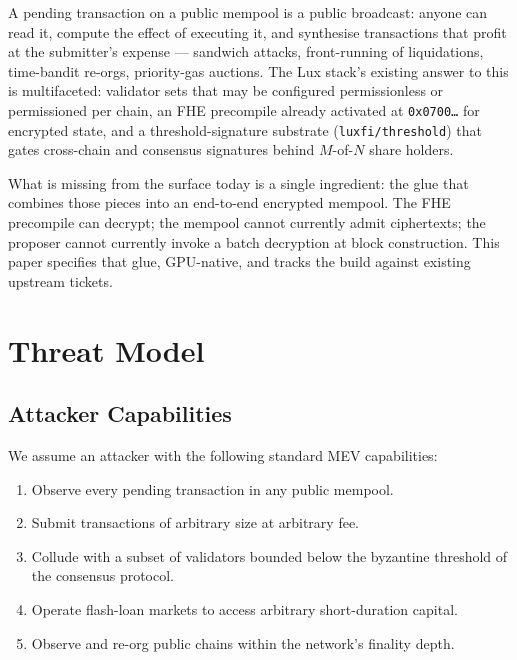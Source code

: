 \documentclass[11pt,a4paper]{article}
\begin{document}
A pending transaction on a public mempool is a public broadcast:
anyone can read it, compute the effect of executing it, and
synthesise transactions that profit at the submitter's expense ---
sandwich attacks, front-running of liquidations, time-bandit
re-orgs, priority-gas auctions. The Lux stack's existing answer to
this is multifaceted: validator sets that may be configured
permissionless or permissioned per chain, an FHE precompile
already activated at \texttt{0x0700\dots} for encrypted state, and
a threshold-signature substrate (\texttt{luxfi/threshold}) that
gates cross-chain and consensus signatures behind $M$-of-$N$ share
holders.

What is missing from the surface today is a single ingredient: the
glue that combines those pieces into an end-to-end encrypted
mempool. The FHE precompile can decrypt; the mempool cannot
currently admit ciphertexts; the proposer cannot currently invoke a
batch decryption at block construction. This paper specifies that
glue, GPU-native, and tracks the build against existing upstream
tickets.

\section{Threat Model}

\subsection{Attacker Capabilities}

We assume an attacker with the following standard MEV capabilities:

\begin{enumerate}[nosep,label=\textbf{C\arabic*.}]
\item Observe every pending transaction in any public mempool.
\item Submit transactions of arbitrary size at arbitrary fee.
\item Collude with a subset of validators bounded below the
  byzantine threshold of the consensus protocol.
\item Operate flash-loan markets to access arbitrary short-duration
  capital.
\item Observe and re-org public chains within the network's
  finality depth.
\end{enumerate}
\end{document}
